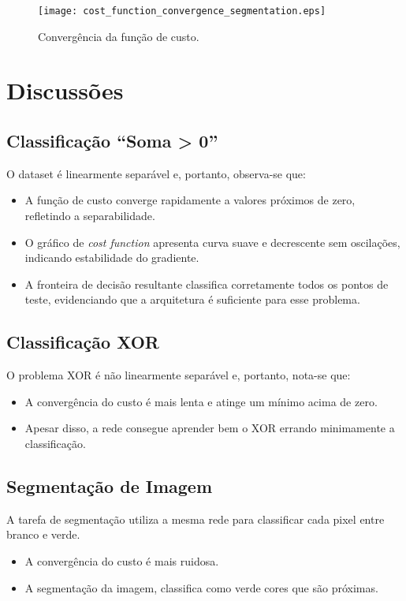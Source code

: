 \documentclass[a4paper,12pt]{article}
\begin{document}
\begin{figure}[!h]
    \centering
    \texttt{[image: cost\_function\_convergence\_segmentation.eps]}
    \caption{Convergência da função de custo.}
\end{figure}

\newpage
\section{Discussões}

\subsection{Classificação “Soma > 0”}
O dataset é linearmente separável e, portanto, observa-se que:
\begin{itemize}
  \item A função de custo converge rapidamente a valores próximos de zero, refletindo a separabilidade.  
  \item O gráfico de \textit{cost function} apresenta curva suave e decrescente sem oscilações, indicando estabilidade do gradiente.  
  \item A fronteira de decisão resultante classifica corretamente todos os pontos de teste, evidenciando que a arquitetura é suficiente para esse problema.
\end{itemize}

\subsection{Classificação XOR}
O problema XOR é não linearmente separável e, portanto, nota-se que:
\begin{itemize}
  \item A convergência do custo é mais lenta e atinge um mínimo acima de zero.
  \item Apesar disso, a rede consegue aprender bem o XOR errando minimamente a classificação.
\end{itemize}

\subsection{Segmentação de Imagem}
A tarefa de segmentação utiliza a mesma rede para classificar cada pixel entre branco e verde.
\begin{itemize}
  \item A convergência do custo é mais ruidosa. 
  \item A segmentação da imagem, classifica como verde cores que são próximas. 
\end{itemize}
\end{document}
